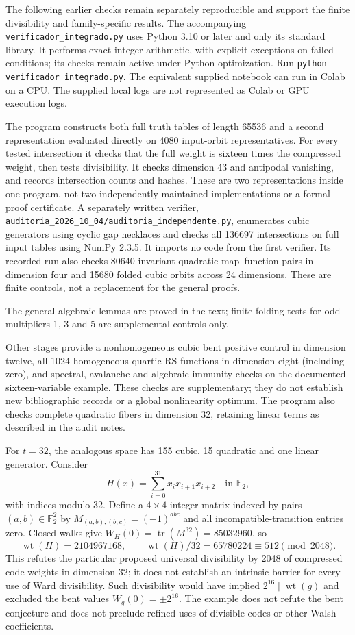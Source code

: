 \documentclass[11pt,a4paper]{article}
\newcommand{\F}{\mathbb F_2}
\newcommand{\wt}{\operatorname{wt}}
\begin{document}
The following earlier checks remain separately reproducible and support the finite divisibility and family-specific results. 
The accompanying \texttt{verificador\_integrado.py} uses Python 3.10 or
later and only its standard library. It performs exact integer arithmetic,
with explicit exceptions on failed conditions; its checks remain active
under Python optimization. Run \texttt{python verificador\_integrado.py}.
The equivalent supplied notebook can run in Colab on a CPU. The supplied
local logs are not represented as Colab or GPU execution logs.

The program constructs both full truth tables of length 65536 and a second
representation evaluated directly on 4080 input-orbit representatives.
For every tested intersection it checks that the full weight is sixteen
times the compressed weight, then tests divisibility. It checks dimension
43 and antipodal vanishing, and records intersection counts and hashes.
These are two representations inside one program, not two independently
maintained implementations or a formal proof certificate.
A separately written verifier, \texttt{auditoria\_2026\_10\_04/auditoria\_independente.py}, enumerates cubic generators using cyclic gap necklaces and checks all 136697 intersections on full input tables using NumPy 2.3.5. It imports no code from the first verifier. Its recorded run also checks 80640 invariant quadratic map--function pairs in dimension four and 15680 folded cubic orbits across 24 dimensions. These are finite controls, not a replacement for the general proofs.\par
The general algebraic lemmas are proved in the text; finite folding
tests for odd multipliers 1, 3 and 5 are supplemental controls only.

Other stages provide a nonhomogeneous cubic bent positive control in
dimension twelve, all 1024 homogeneous quartic RS functions in dimension
eight (including zero), and spectral, avalanche and algebraic-immunity
checks on the documented sixteen-variable example. These checks are
supplementary; they do not establish new bibliographic records or a global
nonlinearity optimum. The program also checks complete quadratic fibers
in dimension 32, retaining linear terms as described in the audit notes.

For $t=32$, the analogous space has 155 cubic, 15 quadratic and one linear generator. Consider
\[H(x)=\sum_{i=0}^{31}x_i x_{i+1}x_{i+2}\quad\text{in }\F,\]
with indices modulo 32. Define a $4\times4$ integer matrix indexed by pairs $(a,b)\in\F^2$ by $M_{(a,b),(b,c)}=(-1)^{abc}$ and all incompatible-transition entries zero. Closed walks give $W_H(0)=\operatorname{tr}(M^{32})=85032960$, so
\[\wt(H)=2104967168,\qquad \wt(H)/32=65780224\equiv512\pmod{2048}.\]
This refutes the particular proposed universal divisibility by 2048 of compressed code weights in dimension 32; it does not establish an intrinsic barrier for every use of Ward divisibility. Such divisibility would have implied $2^{16}\mid\wt(g)$ and excluded the bent values $W_g(0)=\pm2^{16}$. The example does not refute the bent conjecture and does not preclude refined uses of divisible codes or other Walsh coefficients.
\end{document}
